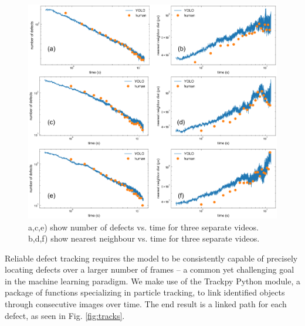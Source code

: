 \documentclass[prl,reprint,showpacs,floatfix,nofootinbib]{revtex4-1}
\begin{document}
\begin{figure}
  \includegraphics[width=\linewidth]{humanVmachineAllR.png}
  \caption{a,c,e) show number of defects vs. time for three separate videos. b,d,f) show nearest neighbour vs. time for three separate videos.}
  \label{fig:HumanVMachine}
\end{figure}

Reliable defect tracking requires the model to be consistently capable of precisely locating defects over a larger number of frames -- a common yet challenging goal in the machine learning paradigm. We make use of the Trackpy Python module, a package of functions specializing in particle tracking, to link identified objects through consecutive images over time. The end result is a linked path for each defect, as seen in Fig. \ref{fig:tracks}.
\end{document}

